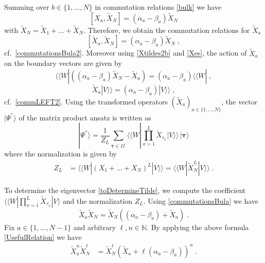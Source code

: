 \documentclass[10pt]{article}
\numberwithin{equation}{section}
\numberwithin{equation}{subsection}
\newcommand{\Xt}{\widetilde{X}}
\newcommand{\co}{\;,}
\newcommand{\dt}{\;.}
\begin{document}
Summing over $b\in \{1,\ldots,N\}$ in commutation relations \eqref{bulk} we have
\begin{equation} 
	\left[X_{a},\Xt_{N}\right]=(\alpha_{a}-\beta_{a})\Xt_{N}
\end{equation}
with $\widetilde{X}_{N}=\widetilde{X}_{1}+\ldots+\widetilde{X}_{N}$. 
Therefore, we obtain the commutation relations for $\Xt_{a}$ 
\begin{equation}\label{commutationsBula}
	\left[\Xt_{a},\Xt_{N}\right]=(\alpha_{a}-\beta_{a})\Xt_{N}\co
\end{equation}
cf.~\eqref{commutationsBula2}.
Moreover using \eqref{Xtildes2b} and \eqref{Xes}, the action of $\Xt_{a}$ on the boundary vectors are given by 
\begin{equation}\label{commLEFT}
	 \langle \langle W|  \left((\alpha_{a}-\beta_{a})\Xt_{N}-\Xt_{a}\right)=(\alpha_{a}-\beta_{a}) \langle \langle W|  
	\co
\end{equation}
\begin{equation}\label{commRIGHT}
	\Xt_{a}  |V\rangle\rangle = (\alpha_{a}-\beta_{a}) |V\rangle\rangle 
	\co
\end{equation} 
cf.~\eqref{commLEFT2}.
Using the transformed operators $(\widetilde{X}_{a})_{a\in\{1,\ldots,N\}}$, the vector $|\Psi^{''}\rangle$ of the matrix product ansatz is written as
\begin{equation}\label{toDetermineTilde}
	|\Psi^{''}\rangle = \frac{1}{Z_{L}}\sum_{\bm{\tau}\in \Omega^{'}} \langle \langle W|  \prod_{x=1}^{L}\widetilde{X}_{\tau_{x}}
	|V\rangle\rangle \,|\bm{\tau}\rangle
\end{equation}
where the normalization is given by 
\begin{align}
		Z_{L}&= \langle \langle W|  (X_{1}+\ldots+X_{N})^{L} |V\rangle\rangle = \langle \langle W|  \widetilde{X}_{N}^{L} |V\rangle\rangle \dt
\end{align}

To determine the eigenvector \eqref{toDetermineTilde}, we compute the coefficient $ \langle \langle W|  \prod_{x=1}^{L}\widetilde{X}_{\tau_{x}}
|V \rangle$ and the normalization $Z_{L}$. Using \eqref{commutationsBula} we have
\begin{equation}\label{UsefulRelation}
	\widetilde{X}_{a}\widetilde{X}_{N}=\widetilde{X}_{N}\left((\alpha_{a}-\beta_{a})+\widetilde{X}_{a}\right)\dt
\end{equation}
Fix $ a\in \{1,\ldots,N-1\}$ and arbitrary $ \ell,n\in \mathbb{N}$. By applying the above formula \eqref{UsefulRelation} we have
\begin{align}\label{usefulRelaton-many}
	\widetilde{X}_{a}^{n}\widetilde{X}_{N}^{\ell}&=
	\widetilde{X}_{N}^{\ell}\left(\widetilde{X}_{a}+\ell(\alpha_{a}-\beta_{a})\right)^{n}\dt
\end{align}
\end{document}
